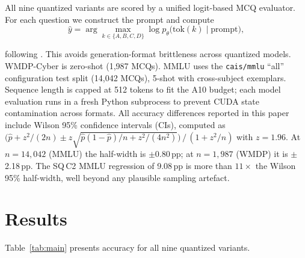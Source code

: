 \documentclass[11pt]{article}
\newcommand{\wmdp}{WMDP-Cyber}
\begin{document}
All nine quantized variants are scored by a unified logit-based MCQ
evaluator.  For each question we construct the prompt and compute
\[
  \hat{y} = \arg\max_{k \in \{A,B,C,D\}} \log p_\theta\!\bigl(\text{tok}(k)
            \mid \text{prompt}\bigr),
\]
\begin{sloppypar}
following \citet{hendrycks2021mmlu}.  This avoids generation-format
brittleness across quantized models.  \wmdp{} is zero-shot (1,987
MCQs).  MMLU uses the \texttt{cais/mmlu} ``all'' configuration test
split (14,042 MCQs), 5-shot with cross-subject exemplars.  Sequence
length is capped at 512 tokens to fit the A10 budget; each model
evaluation runs in a fresh Python subprocess to prevent CUDA state
contamination across formats.  All accuracy differences reported
in this paper include Wilson 95\% confidence intervals (CIs),
computed as $\bigl(\hat{p} + z^2/(2n) \pm
z\sqrt{\hat{p}(1-\hat{p})/n + z^2/(4n^2)}\bigr) \,/\, (1 + z^2/n)$
with $z = 1.96$.  At $n = 14{,}042$ (MMLU) the half-width is
$\pm$0.80\,pp; at $n = 1{,}987$ (WMDP) it is $\pm$2.18\,pp.  The
SQ\,C2 MMLU regression of 9.08\,pp is more than $11\times$ the
Wilson 95\% half-width, well beyond any plausible sampling
artefact.
\end{sloppypar}

\section{Results}
\label{sec:results}

Table~\ref{tab:main} presents accuracy for all nine quantized variants.
\end{document}
